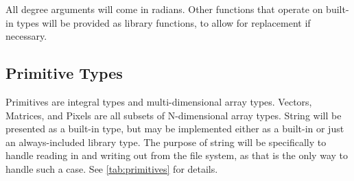 All degree arguments will come in radians. Other functions that operate on built-in types will be provided as library functions, to allow for replacement if necessary.

\subsection{Primitive Types}
Primitives are integral types and multi-dimensional array types. Vectors, Matrices, and Pixels are all subsets of N-dimensional array types. String will be presented as a built-in type, but may be implemented either as a built-in or just an always-included library type. The purpose of string will be specifically to handle reading in and writing out from the file system, as that is the only way to handle such a case. See \ref{tab:primitives} for details.

